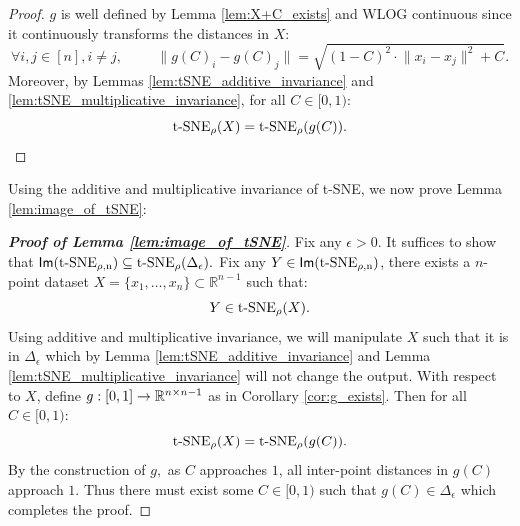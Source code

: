 \begin{proof}
    $g$ is well defined by Lemma \ref{lem:X+C_exists} and WLOG continuous since it continuously transforms the distances in $X$:
    $$\forall i,j \in [n], i\neq j, \hspace{1cm} \lVert g(C)_i - g(C)_j \rVert = \sqrt{(1-C)^2 \cdot \lVert x_i - x_j \rVert^2 + C}.$$
    Moreover, by Lemmas \ref{lem:tSNE_additive_invariance} and \ref{lem:tSNE_multiplicative_invariance}, for all $C \in [0,1):$
    $${\operatorname*{t-SNE}}_\rho(X) = {\operatorname*{t-SNE}}_\rho(g(C)).$$
\end{proof}

Using the additive and multiplicative invariance of t-SNE, we now prove Lemma \ref{lem:image_of_tSNE}:

%

\begin{proof}[\textbf{Proof of Lemma \ref{lem:image_of_tSNE}}] 
    Fix any $\epsilon>0$. It suffices to show that ${\operatorname*{\mathsf{Im}({\operatorname*{t-SNE}}_{\rho,n})}} \subseteq {\operatorname*{t-SNE}}_\rho(\Delta_\epsilon).$ Fix any $Y \in {\operatorname*{\mathsf{Im}({\operatorname*{t-SNE}}_{\rho,n})}}$, there exists a $n$-point dataset $X = \{x_1,\ldots,x_n\} \subset \mathbb{R}^{n-1}$ such that:
    $$Y \in {\operatorname*{t-SNE}}_\rho(X).$$
    Using additive and multiplicative invariance, we will manipulate $X$ such that it is in $\Delta_\epsilon$ which by Lemma \ref{lem:tSNE_additive_invariance} and Lemma \ref{lem:tSNE_multiplicative_invariance} will not change the output. %
    With respect to $X$, define $g:[0,1]\to\mathbb{R}^{n\times n-1}$ as in Corollary \ref{cor:g_exists}. Then for all $C \in [0,1):$
    $${\operatorname*{t-SNE}}_\rho(X) = {\operatorname*{t-SNE}}_\rho(g(C)).$$
    By the construction of $g,$ as $C$ approaches $1$, all inter-point distances in $g(C)$ approach $1$. Thus there must exist some $C \in [0,1)$ such that $g(C) \in \Delta_\epsilon$ which completes the proof.
\end{proof}

